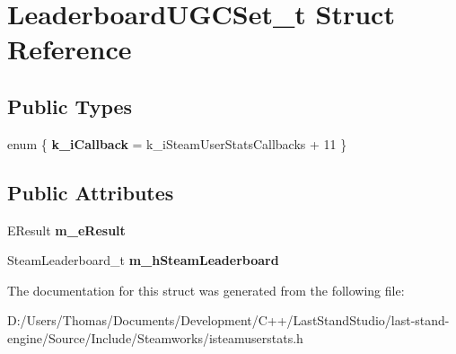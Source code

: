 \hypertarget{structLeaderboardUGCSet__t}{}\section{Leaderboard\+U\+G\+C\+Set\+\_\+t Struct Reference}
\label{structLeaderboardUGCSet__t}
\subsection*{Public Types}
\begin{DoxyCompactItemize}
\item 
\hypertarget{structLeaderboardUGCSet__t_a8c7034aed4a4fe6e3b1fe0fd7430a5e1}{}enum \{ {\bfseries k\+\_\+i\+Callback} = k\+\_\+i\+Steam\+User\+Stats\+Callbacks + 11
 \}\label{structLeaderboardUGCSet__t_a8c7034aed4a4fe6e3b1fe0fd7430a5e1}

\end{DoxyCompactItemize}
\subsection*{Public Attributes}
\begin{DoxyCompactItemize}
\item 
\hypertarget{structLeaderboardUGCSet__t_a6af1c684cb4b5bed5029e74ad1878245}{}E\+Result {\bfseries m\+\_\+e\+Result}\label{structLeaderboardUGCSet__t_a6af1c684cb4b5bed5029e74ad1878245}

\item 
\hypertarget{structLeaderboardUGCSet__t_aa93d0b835359ee86f532b13c186e7abc}{}Steam\+Leaderboard\+\_\+t {\bfseries m\+\_\+h\+Steam\+Leaderboard}\label{structLeaderboardUGCSet__t_aa93d0b835359ee86f532b13c186e7abc}

\end{DoxyCompactItemize}


The documentation for this struct was generated from the following file\+:\begin{DoxyCompactItemize}
\item 
D\+:/\+Users/\+Thomas/\+Documents/\+Development/\+C++/\+Last\+Stand\+Studio/last-\/stand-\/engine/\+Source/\+Include/\+Steamworks/isteamuserstats.\+h\end{DoxyCompactItemize}
